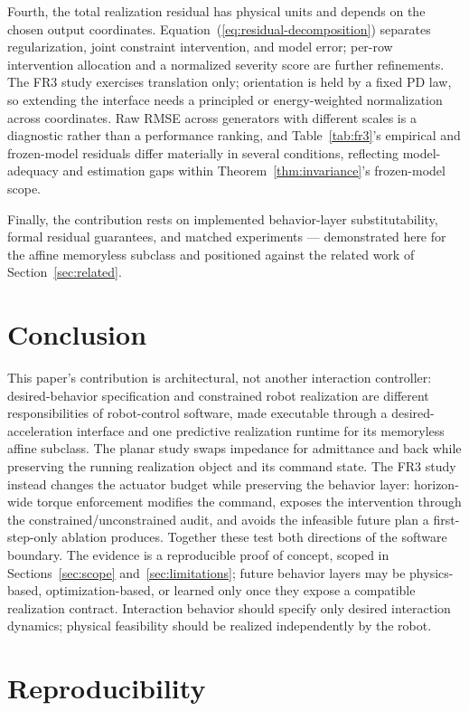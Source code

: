 \documentclass[journal]{IEEEtran}
\begin{document}
Fourth, the total realization residual has physical units and depends on
the chosen output coordinates. Equation~(\ref{eq:residual-decomposition})
separates regularization, joint constraint intervention, and model
error; per-row intervention allocation and a normalized severity score
are further refinements. The FR3 study exercises translation only;
orientation is held by a fixed PD law, so extending the
interface needs a principled or energy-weighted normalization across
coordinates. Raw RMSE across generators with different scales is a
diagnostic rather than a performance ranking, and Table~\ref{tab:fr3}'s
empirical and frozen-model residuals differ materially in several
conditions, reflecting model-adequacy and estimation gaps within
Theorem~\ref{thm:invariance}'s frozen-model scope.

Finally, the contribution rests on implemented behavior-layer
substitutability, formal residual guarantees, and matched experiments ---
demonstrated here for the affine memoryless subclass and positioned
against the related work of Section~\ref{sec:related}.

\section{Conclusion}

This paper's contribution is architectural, not another interaction
controller: desired-behavior specification and constrained robot
realization are different responsibilities of robot-control software,
made executable through a desired-acceleration interface and one
predictive realization runtime for its memoryless affine subclass. The
planar study swaps impedance for admittance and back while preserving
the running realization object and its command state. The FR3 study
instead changes the actuator budget while preserving the behavior layer:
horizon-wide torque enforcement modifies the command, exposes the
intervention through the constrained/unconstrained audit, and avoids the
infeasible future plan
a first-step-only ablation produces. Together these test both directions
of the software boundary. The evidence is a reproducible proof of
concept, scoped in Sections~\ref{sec:scope} and~\ref{sec:limitations};
future behavior layers may be physics-based, optimization-based, or
learned only once they expose a compatible realization contract.
Interaction behavior should specify only desired interaction dynamics;
physical feasibility should be realized independently by the robot.

\section*{Reproducibility}
\end{document}
